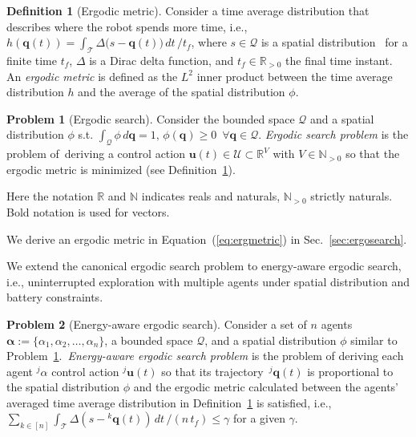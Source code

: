 \documentclass[letterpaper,10pt,conference,twoside]{IEEEtran}
\theoremstyle{definition}
\newtheorem{defn}{Definition}[section]
\newtheorem{pb}{Problem}[section]
\begin{document}
\begin{defn}[Ergodic metric]\label{def:ergom}
  Consider a time average distribution that describes where the robot spends more time, i.e., $h(\mathbf{q}(t))=\int_{\mathcal{T}}{\Delta\big(s-\mathbf{q}(t)\big)}\,dt\,/t_f$, 
  where $s\in\mathcal{Q}$ is a spatial distribution~\cite{abraham2018decentralized} for a finite time $t_f$, $\Delta$ is a Dirac delta function, and $t_f\in\mathbb{R}_{>0}$ the final time instant. 
  An \textit{ergodic metric} is defined as the $L^2$ inner product between the time average distribution $h$ and the average of the spatial distribution $\phi$.
\end{defn}

\begin{pb}[Ergodic search]\label{pb:ergo}
  Consider the bounded space $\mathcal{Q}$ and a spatial distribution $\phi$ s.t. $\int_{\mathcal{Q}}\phi\,d\mathbf{q}=1,\,\phi(\mathbf{q})\geq 0\,\,\, \forall \mathbf{q}\in\mathcal{Q}$.
  \textit{Ergodic search problem} is the problem of~deriving a control action $\mathbf{u}(t)\in\mathcal{U}\subset\mathbb{R}^V$ with $V\in\mathbb{N}_{>0}$ so that the ergodic metric is minimized (see Definition~\ref{def:ergom}). %
\end{pb}

Here the notation $\mathbb{R}$ and $\mathbb{N}$ indicates reals and naturals, $\mathbb{N}_{>0}$ strictly naturals. Bold notation is used for vectors.

We derive an ergodic metric in Equation~(\ref{eq:ergmetric}) in Sec.~\ref{sec:ergosearch}.

We extend the canonical ergodic search problem to energy-aware ergodic search, i.e., uninterrupted exploration with multiple agents under spatial distribution and battery constraints.

\begin{pb}[Energy-aware ergodic search]\label{pb:enerergo}
  Consider a set of $n$ agents $\boldsymbol{\alpha}:=\{\alpha_1,\alpha_2,\dots,\alpha_n\}$, a bounded space $\mathcal{Q}$, and a spatial distribution $\phi$ similar to Problem~\ref{pb:ergo}.~\textit{Energy-aware ergodic search problem} is the problem of deriving each agent ${}^j\alpha$ control action ${}^j\mathbf{u}(t)$ so that its trajectory~${}^j\mathbf{q}(t)$ is proportional to the spatial distribution $\phi$ and %
  the ergodic metric calculated between the agents' averaged time average distribution in Definition~\ref{def:ergom} is satisfied, i.e., $\sum_{k\in[n]}\int_{\mathcal{T}}{\Delta(s-{}^k\mathbf{q}(t))\,dt\,/(n\,t_f)}\leq \gamma$ for a given $\gamma$.%
\end{pb}
\end{document}
